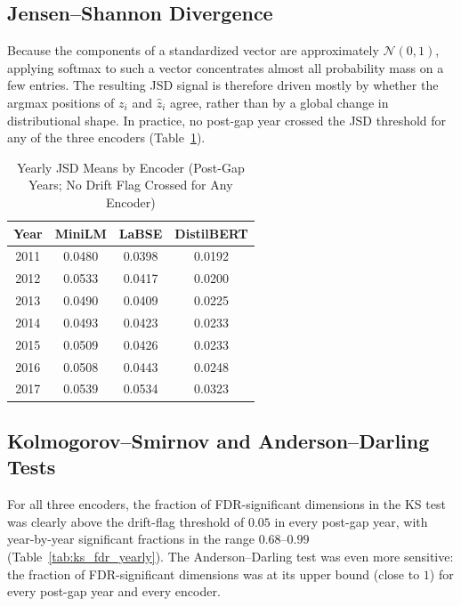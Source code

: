 \documentclass[conference]{IEEEtran}
\begin{document}
\subsection{Jensen--Shannon Divergence}

Because the components of a standardized vector are approximately $\mathcal{N}(0, 1)$, applying softmax to such a vector concentrates almost all probability mass on a few entries. The resulting JSD signal is therefore driven mostly by whether the argmax positions of $z_i$ and $\hat{z}_i$ agree, rather than by a global change in distributional shape. In practice, no post-gap year crossed the JSD threshold for any of the three encoders (Table~\ref{tab:jsd_yearly}).

\begin{table}[htbp]
\caption{Yearly JSD Means by Encoder (Post-Gap Years; No Drift Flag Crossed for Any Encoder)}
\label{tab:jsd_yearly}
\begin{center}
\begin{tabular}{|c|c|c|c|}
\hline
\textbf{Year} & \textbf{MiniLM} & \textbf{LaBSE} & \textbf{DistilBERT} \\
\hline
2011 & 0.0480 & 0.0398 & 0.0192 \\
2012 & 0.0533 & 0.0417 & 0.0200 \\
2013 & 0.0490 & 0.0409 & 0.0225 \\
2014 & 0.0493 & 0.0423 & 0.0233 \\
2015 & 0.0509 & 0.0426 & 0.0233 \\
2016 & 0.0508 & 0.0443 & 0.0248 \\
2017 & 0.0539 & 0.0534 & 0.0323 \\
\hline
\end{tabular}
\end{center}
\end{table}

\subsection{Kolmogorov--Smirnov and Anderson--Darling Tests}

For all three encoders, the fraction of FDR-significant dimensions in the KS test was clearly above the drift-flag threshold of $0.05$ in every post-gap year, with year-by-year significant fractions in the range $0.68$--$0.99$ (Table~\ref{tab:ks_fdr_yearly}). The Anderson--Darling test was even more sensitive: the fraction of FDR-significant dimensions was at its upper bound (close to $1$) for every post-gap year and every encoder.
\end{document}
